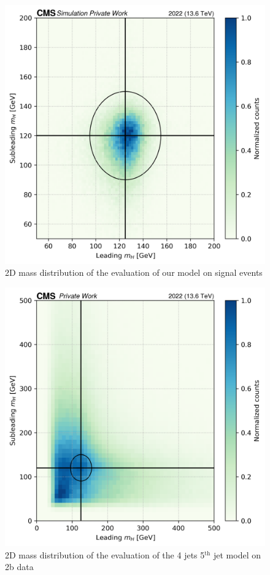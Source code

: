 \begin{figure}[hbt]
    \centering
    \includegraphics[width=0.6\linewidth]{Images/6.Improving/Mass sculpting/signal mhh.png}
    \caption{2D mass distribution of the evaluation of our model on signal events}
    \label{fig: 2D mass dist sig}
\end{figure}


\begin{figure}[hbt]
    \centering
    \includegraphics[width=0.6\linewidth]{Images/6.Improving/Mass sculpting/mass sculpting 4j5g.png}
    \caption{2D mass distribution of the evaluation of the 4 jets 5$^{\text{th}}$ jet model on 2b data}
    \label{fig: 2D mass sculpting for 4j5g}
\end{figure}



